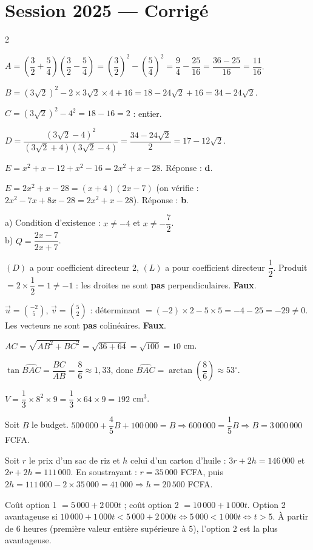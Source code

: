 \section{Session 2025 — Corrigé}
\begin{multicols}{2}

$A=\left(\dfrac32+\dfrac54\right)\left(\dfrac32-\dfrac54\right)=\left(\dfrac32\right)^{2}-\left(\dfrac54\right)^{2}=\dfrac94-\dfrac{25}{16}=\dfrac{36-25}{16}=\dfrac{11}{16}$.

$B=(3\sqrt2)^{2}-2\times3\sqrt2\times4+16=18-24\sqrt2+16=34-24\sqrt2$.

$C=(3\sqrt2)^{2}-4^{2}=18-16=2$ : entier.

$D=\dfrac{(3\sqrt2-4)^{2}}{(3\sqrt2+4)(3\sqrt2-4)}=\dfrac{34-24\sqrt2}{2}=17-12\sqrt2$.

$E=x^{2}+x-12+x^{2}-16=2x^{2}+x-28$. Réponse : \textbf{d}.

$E=2x^{2}+x-28=(x+4)(2x-7)$ (on vérifie : $2x^{2}-7x+8x-28=2x^{2}+x-28$). Réponse :
\textbf{b}.

a) Condition d'existence : $x\ne-4$ et $x\ne-\dfrac72$. \\
b) $Q=\dfrac{2x-7}{2x+7}$.

$(D)$ a pour coefficient directeur $2$, $(L)$ a pour coefficient directeur $\dfrac12$.
Produit $=2\times\dfrac12=1\ne-1$ : les droites ne sont \textbf{pas} perpendiculaires.
\textbf{Faux}.

$\vec u=\binom{-2}5$, $\vec v=\binom52$ : déterminant $=(-2)\times2-5\times5=-4-25=-29\ne0$.
Les vecteurs ne sont \textbf{pas} colinéaires. \textbf{Faux}.

$AC=\sqrt{AB^{2}+BC^{2}}=\sqrt{36+64}=\sqrt{100}=10$ cm.

$\tan\widehat{BAC}=\dfrac{BC}{AB}=\dfrac86\approx1{,}33$, donc
$\widehat{BAC}=\arctan\left(\dfrac86\right)\approx53^{\circ}$.

$V=\dfrac13\times8^{2}\times9=\dfrac13\times64\times9=192$ cm$^{3}$.

Soit $B$ le budget. $500\,000+\dfrac45B+100\,000=B\Rightarrow600\,000=\dfrac15B\Rightarrow
B=3\,000\,000$ FCFA.

Soit $r$ le prix d'un sac de riz et $h$ celui d'un carton d'huile : $3r+2h=146\,000$ et
$2r+2h=111\,000$. En soustrayant : $r=35\,000$ FCFA, puis
$2h=111\,000-2\times35\,000=41\,000\Rightarrow h=20\,500$ FCFA.

Coût option 1 $=5\,000+2\,000t$ ; coût option 2 $=10\,000+1\,000t$. Option 2 avantageuse si
$10\,000+1\,000t<5\,000+2\,000t\Leftrightarrow5\,000<1\,000t\Leftrightarrow t>5$. À partir de
$6$ heures (première valeur entière supérieure à $5$), l'option $2$ est la plus
avantageuse.

\end{multicols}
\exercicesBanner
